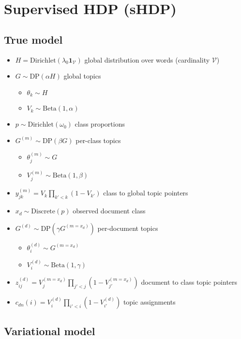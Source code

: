 \documentclass{article}
\newcommand{\Beta}{\ensuremath{\mathrm{Beta}}}
\newcommand{\Dirichlet}{\ensuremath{\mathrm{Dirichlet}}}
\newcommand{\Discrete}{\ensuremath{\mathrm{Discrete}}}
\newcommand{\DP}{\ensuremath{\mathrm{DP}}}
\newcommand{\V}{\ensuremath{\mathcal{V}}}
\newcommand{\one}{\ensuremath{\mathbf{1}}}
\begin{document}
\section*{Supervised HDP (sHDP)}

\subsection*{True model}

\begin{itemize}
\item $\displaystyle H = \Dirichlet\left(\lambda_0 \one_\V\right)$ global distribution over words (cardinality $\V$)
\item $G \sim \DP\left(\alpha H\right)$ global topics
    \begin{itemize}
    \item $\theta_k \sim H$
    \item $V_k \sim \Beta(1, \alpha)$
    \end{itemize}
\item $p \sim \Dirichlet(\omega_0)$ class proportions
\item $G^{(m)} \sim \DP\left(\beta G\right)$ per-class topics
    \begin{itemize}
    \item $\theta_j^{(m)} \sim G$
    \item $V_j^{(m)} \sim \Beta(1, \beta)$
    \end{itemize}
\item $y_{jk}^{(m)} = V_k \prod_{k'<k} (1 - V_{k'})$ class to global topic pointers
\item $x_d \sim \Discrete(p)$ observed document class
\item $G^{(d)} \sim \DP\left(\gamma G^{(m=x_d)}\right)$ per-document topics
    \begin{itemize}
    \item $\theta_i^{(d)} \sim G^{(m=x_d)}$
    \item $V_i^{(d)} \sim \Beta(1, \gamma)$
    \end{itemize}
\item $z_{ij}^{(d)} = V_j^{(m=x_d)} \prod_{j'<j} (1 - V_{j'}^{(m=x_d)})$ document to class topic pointers
\item $c_{dn}(i) = V_i^{(d)} \prod_{i'<i} (1 - V_{i'}^{(d)})$ topic assignments
\end{itemize}


\subsection*{Variational model}
\end{document}
